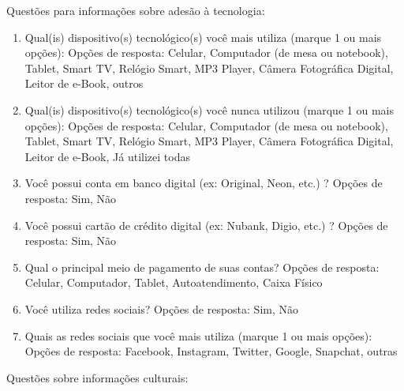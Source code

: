 Questões para informações sobre adesão à tecnologia:

\begin{enumerate}
	\item Qual(is) dispositivo(s) tecnológico(s) você mais utiliza (marque 1 ou mais opções): Opções de resposta: Celular, Computador (de mesa ou notebook), Tablet, Smart TV, Relógio Smart, MP3 Player, Câmera Fotográfica Digital, Leitor de e-Book, outros
	\item Qual(is) dispositivo(s) tecnológico(s) você nunca utilizou (marque 1 ou mais opções): Opções de resposta: Celular, Computador (de mesa ou notebook), Tablet, Smart TV, Relógio Smart, MP3 Player, Câmera Fotográfica Digital, Leitor de e-Book, Já utilizei todas
	\item Você possui conta em banco digital (ex: Original, Neon, etc.) ? Opções de resposta: Sim, Não
	\item Você possui cartão de crédito digital (ex: Nubank, Digio, etc.) ? Opções de resposta: Sim, Não
	\item Qual o principal meio de pagamento de suas contas? Opções de resposta: Celular, Computador, Tablet, Autoatendimento, Caixa Físico
	\item Você utiliza redes sociais? Opções de resposta: Sim, Não
	\item Quais as redes sociais que você mais utiliza (marque 1 ou mais opções): Opções de resposta: Facebook, Instagram, Twitter, Google\+, Snapchat, outras
\end{enumerate}

Questões sobre informações culturais:

